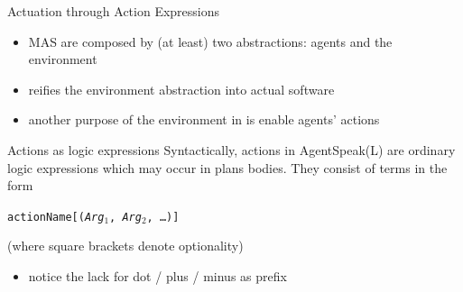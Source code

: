 \documentclass[presentation]{beamer}\mode<presentation>{\usetheme{AMSBolognaFC}}
\begin{document}
\begin{frame}[c]{Actuation through Action Expressions}
    
    \begin{itemize}
        \item MAS are composed by (at least) two abstractions: agents and the \alert{environment}
        
        \vfill
        
        \item \jason{} reifies the environment abstraction into actual software
        
        \vfill
        
        \item \alert{another} purpose of the environment in \jason{} is enable agents' \alert{actions}
        
    \end{itemize}
    
    \vfill
    
    \begin{block}{Actions as logic expressions}
        Syntactically, actions in AgentSpeak(L) are ordinary logic expressions which may occur in plans bodies.
        They consist of terms in the form
        \begin{center}
            \texttt{actionName\alert{[}(\textit{Arg}$_1$, \textit{Arg}$_2$, \ldots)\alert{]}}
        \end{center}
        (where square brackets denote optionality)
        \begin{itemize}
            \item notice the lack for dot / plus / minus as prefix
        \end{itemize}
    \end{block}
    
\end{frame} 
\end{document}
